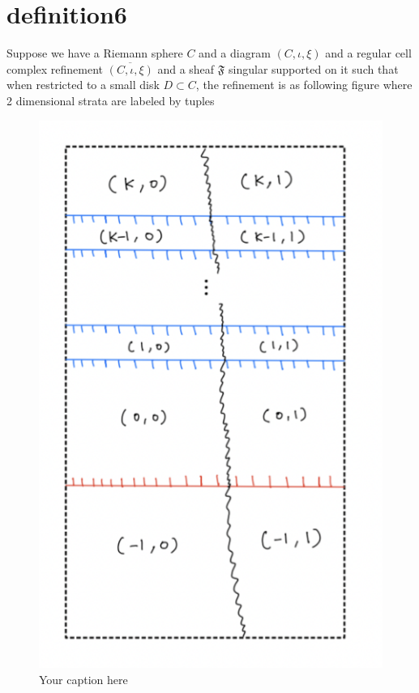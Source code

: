 \section{definition6}
\begin{definition}
\end{definition}
Suppose we have a Riemann sphere $C$ and a diagram $(C,\iota,\xi)$ and a regular cell complex refinement $\overline{(C,\iota,\xi)}$ and a sheaf $\mathfrak{F}$ singular supported on it such that when restricted to a small disk $D\subset C$, the refinement is as following figure where 2 dimensional strata are labeled by tuples

\begin{figure}[H] %
    \centering
    \includegraphics[scale = 0.95]{diagrams/definition6/1.png} %
    \caption{Your caption here}
    \label{fig:your-label}
\end{figure}

